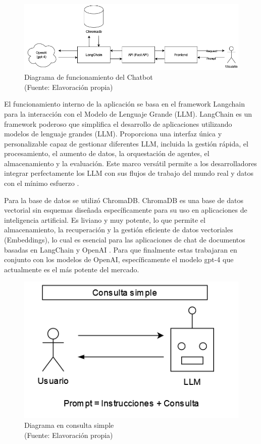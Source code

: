 \begin{figure}[ht!]
    \centering
    \includegraphics[width=.8\textwidth]{figures/finalhuemul.png}
    \caption[Diagrama de funcionamiento del Chatbot]{Diagrama de funcionamiento del Chatbot\\
    {\scriptsize (Fuente: Elavoración propia)}}
    \label{fig:chatbot1}
\end{figure}

El funcionamiento interno de la aplicación se basa en el framework Langchain para la interacción con el Modelo de Lenguaje Grande (LLM). 
LangChain es un framework poderoso que simplifica el desarrollo de aplicaciones utilizando modelos de lenguaje grandes (LLM). Proporciona 
una interfaz única y personalizable capaz de gestionar diferentes LLM, incluida la gestión rápida, el procesamiento, el aumento de datos, 
la orquestación de agentes, el almacenamiento y la evaluación. Este marco versátil permite a los desarrolladores integrar perfectamente 
los LLM con sus flujos de trabajo del mundo real y datos con el mínimo esfuerzo \cite{langchain1}.

Para la base de datos se utilizó ChromaDB. ChromaDB es una base de datos vectorial sin esquemas diseñada específicamente para 
su uso en aplicaciones de inteligencia artificial. Es liviano y muy potente, lo que permite el almacenamiento, la recuperación 
y la gestión eficiente de datos vectoriales (Embeddings), lo cual es esencial para las aplicaciones de chat de documentos 
basadas en LangChain y OpenAI \cite{langchain1}. Para que finalmente estas trabajaran en conjunto con los modelos de OpenAI, 
específicamente el modelo gpt-4 que actualmente es el más potente del mercado.

\begin{figure}[ht!]
    \centering
    \includegraphics[width=.4\textwidth]{figures/huemul6.png}
    \caption[Diagrama en consulta simple]{Diagrama en consulta simple\\
    {\scriptsize (Fuente: Elavoración propia)}}
    \label{fig:chatbot1}
\end{figure}


